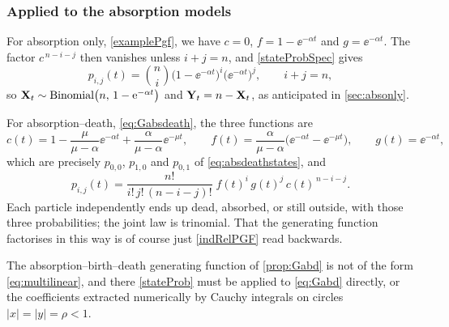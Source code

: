 \subsubsection*{Applied to the absorption models}

For absorption only, \cref{examplePgf}, we have $c=0$, $f = 1-\ee^{-\alpha t}$ and
$g = \ee^{-\alpha t}$. The factor $c^{\,n-i-j}$ then vanishes unless $i+j=n$, and
\cref{stateProbSpec} gives
\begin{equation*}
p_{i,j}(t) = \binom{n}{i}\bigl(1-\ee^{-\alpha t}\bigr)^{i}\bigl(\ee^{-\alpha t}\bigr)^{j},
\qquad i+j = n,
\end{equation*}
so ${{\bf X}_t}\sim\text{Binomial}\bigl(n,\,1-{\rm e}^{-\alpha t}\bigr)$ and ${{\bf Y}_t} = n-{{\bf X}_t}$, as
anticipated in \cref{sec:absonly}.

For absorption--death, \cref{eq:Gabsdeath}, the three functions are
\begin{equation*}
c(t) = 1-\frac{\mu}{\mu-\alpha}\ee^{-\alpha t} + \frac{\alpha}{\mu-\alpha}\ee^{-\mu t},
\qquad
f(t) = \frac{\alpha}{\mu-\alpha}\bigl(\ee^{-\alpha t}-\ee^{-\mu t}\bigr),
\qquad
g(t) = \ee^{-\alpha t},
\end{equation*}
which are precisely $p_{0,0}$, $p_{1,0}$ and $p_{0,1}$ of \cref{eq:absdeathstates},
and
\begin{equation*}
p_{i,j}(t) = \frac{n!}{i!\,j!\,(n-i-j)!}\;f(t)^{i}\,g(t)^{j}\,c(t)^{\,n-i-j}.
\end{equation*}
Each particle independently ends up dead, absorbed, or still outside, with those
three probabilities; the joint law is trinomial. That the generating function
factorises in this way is of course just \cref{indRelPGF} read backwards.

The absorption--birth--death generating function of \cref{prop:Gabd} is not of the
form \cref{eq:multilinear}, and there \cref{stateProb} must be applied to
\cref{eq:Gabd} directly, or the coefficients extracted numerically by Cauchy
integrals on circles $|x|=|y|=\rho<1$.
